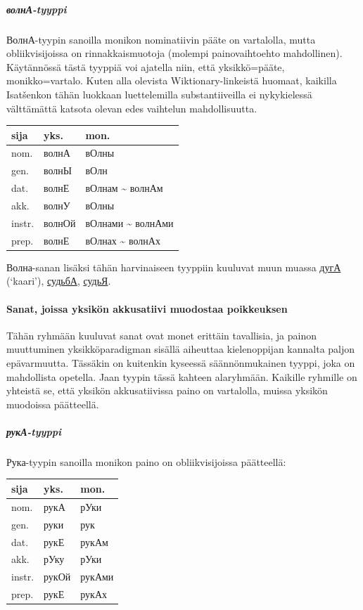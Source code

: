 \documentclass[]{scrartcl}
\begin{document}
\subparagraph{волнА-tyyppi}\label{ux432ux43eux43bux43dux430-tyyppi}

ВолнА-tyypin sanoilla monikon nominatiivin pääte on vartalolla, mutta
obliikvisijoissa on rinnakkaismuotoja (molempi painovaihtoehto
mahdollinen). Käytännössä tästä tyyppiä voi ajatella niin, että
yksikkö=pääte, monikko=vartalo. Kuten alla olevista Wiktionary-linkeistä
huomaat, kaikilla Isatšenkon tähän luokkaan luettelemilla
substantiiveilla ei nykykielessä välttämättä katsota olevan edes
vaihtelun mahdollisuutta.

\begin{longtable}[c]{@{}lll@{}}
\toprule
sija & yks. & mon.\tabularnewline
\midrule
\endhead
nom. & волнА & вОлны\tabularnewline
gen. & волнЫ & вОлн\tabularnewline
dat. & волнЕ & вОлнам \textasciitilde{} волнАм\tabularnewline
akk. & волнУ & вОлны\tabularnewline
instr. & волнОй & вОлнами \textasciitilde{} волнАми\tabularnewline
prep. & волнЕ & вОлнах \textasciitilde{} волнАх\tabularnewline
\bottomrule
\end{longtable}

Волна-sanan lisäksi tähän harvinaiseen tyyppiin kuuluvat muun muassa
\href{http://ru.wiktionary.org/wiki/\%D0\%B4\%D1\%83\%D0\%B3\%D0\%B0}{дугА}
(`kaari'),
\href{http://ru.wiktionary.org/wiki/\%D1\%81\%D1\%83\%D0\%B4\%D1\%8C\%D0\%B1\%D0\%B0}{судьбА},
\href{http://ru.wiktionary.org/wiki/\%D1\%81\%D1\%83\%D0\%B4\%D1\%8C\%D1\%8F}{судьЯ}.

\paragraph{Sanat, joissa yksikön akkusatiivi muodostaa
poikkeuksen}\label{sanat-joissa-yksikuxf6n-akkusatiivi-muodostaa-poikkeuksen}

Tähän ryhmään kuuluvat sanat ovat monet erittäin tavallisia, ja painon
muuttuminen yksikköparadigman sisällä aiheuttaa kielenoppijan kannalta
paljon epävarmuutta. Tässäkin on kuitenkin kyseessä säännönmukainen
tyyppi, joka on mahdollista opetella. Jaan tyypin tässä kahteen
alaryhmään. Kaikille ryhmille on yhteistä se, että yksikön
akkusatiivissa paino on vartalolla, muissa yksikön muodoissa päätteellä.

\subparagraph{рукА-tyyppi}\label{ux440ux443ux43aux430-tyyppi}

Рука-tyypin sanoilla monikon paino on obliikvisijoissa päätteellä:

\begin{longtable}[c]{@{}lll@{}}
\toprule
sija & yks. & mon.\tabularnewline
\midrule
\endhead
nom. & рукА & рУки\tabularnewline
gen. & руки & рук\tabularnewline
dat. & рукЕ & рукАм\tabularnewline
akk. & рУку & рУки\tabularnewline
instr. & рукОй & рукАми\tabularnewline
prep. & рукЕ & рукАх\tabularnewline
\bottomrule
\end{longtable}
\end{document}
